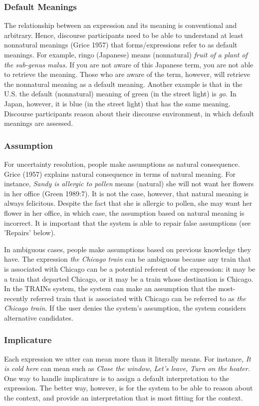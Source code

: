 \subsubsection{Default Meanings}
The relationship between an expression and its meaning is
conventional and arbitrary.  Hence, discourse participants need to be able to understand at least nonnatural meanings (Grice 1957) that forms/expressions refer to as default meanings.  For example, ringo (Japanese)
means (nonnatural) {\em fruit of a plant of the sub-genus malus.}  If you are not aware of this Japanese term, you are not able to retrieve the meaning.  Those who are aware of the term, however, will retrieve the nonnatural meaning as a default meaning.  Another example is that in the U.S. the default (nonnatural) meaning of green (in the street light) is {\em go.}  In Japan, however, it is blue (in the street light) that has the same meaning.  Discourse participants reason about their discourse environment, in which default meanings are assessed.


\subsubsection{Assumption}
For uncertainty resolution, people make assumptions as natural
consequence.  Grice (1957) explains natural consequence in terms of
natural meaning.  For instance, {\em Sandy is allergic to pollen}
means (natural) she will not want her flowers in her office (Green
1989:7).  It is not the case, however, that natural meaning is always felicitous.  Despite the fact that she is allergic to pollen, she may want her flower in her office, in which case, the assumption based on natural meaning is incorrect.  It is important that the system is able to repair false assumptions (see 'Repairs' below).

In ambiguous cases, people make assumptions based on previous knowledge they
have.  The expression {\em the Chicago train} can be ambiguous because
any train that is associated with Chicago can be a potential referent
of the expression: it may be a train that departed Chicago, or it may
be a train whose destination is Chicago.  In the TRAINs system, the
system can make an assumption that the most-recently referred train
that is associated with Chicago can be referred to as {\em the Chicago train.}  If the user denies the system's assumption, the system considers alternative candidates.


\subsubsection{Implicature}
Each expression we utter can mean more than it literally means.  For
instance, {\em It is cold here} can mean such as  {\em Close the
window,} {\em Let's leave,} {\em Turn on the heater.}  One way to handle implicature is to assign a default interpretation to the expression.  The better way, however, is for the system to be able to reason about the context, and provide an interpretation that is most fitting for the context.


